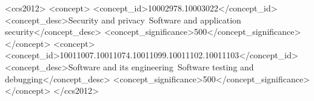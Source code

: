 \documentclass[acmtosem,review,screen]{acmart}
\begin{document}
\title[\papertitleshort]{\papertitle}

\author{\authorAname}
\email{\authorAemail}

\author{\authorBname}
\email{\authorBemail}


\begin{CCSXML}
<ccs2012>
   <concept>
       <concept_id>10002978.10003022</concept_id>
       <concept_desc>Security and privacy~Software and application security</concept_desc>
       <concept_significance>500</concept_significance>
       </concept>
   <concept>
       <concept_id>10011007.10011074.10011099.10011102.10011103</concept_id>
       <concept_desc>Software and its engineering~Software testing and debugging</concept_desc>
       <concept_significance>500</concept_significance>
       </concept>
 </ccs2012>
\end{CCSXML}


\keywords{\paperkeywords}

\maketitle













\appendixcontent

\end{document}
